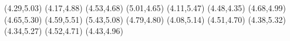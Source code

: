 \psdot[](4.29,5.03)
\psdot[](4.17,4.88)
\psdot[](4.53,4.68)
\psdot[](5.01,4.65)
\psdot[](4.11,5.47)
\psdot[](4.48,4.35)
\psdot[](4.68,4.99)
\psdot[](4.65,5.30)
\psdot[](4.59,5.51)
\psdot[](5.43,5.08)
\psdot[](4.79,4.80)
\psdot[](4.08,5.14)
\psdot[](4.51,4.70)
\psdot[](4.38,5.32)
\psdot[](4.34,5.27)
\psdot[](4.52,4.71)
\psdot[](4.43,4.96)
